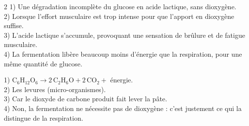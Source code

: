\begin{multicols}{2}
1) Une dégradation incomplète du glucose en acide lactique, sans dioxygène.\\
2) Lorsque l'effort musculaire est trop intense pour que l'apport en dioxygène suffise.\\
3) L'acide lactique s'accumule, provoquant une sensation de brûlure et de fatigue
musculaire.\\
4) La fermentation libère beaucoup moins d'énergie que la respiration, pour une même
quantité de glucose.

1) $\mathrm{C_6H_{12}O_6\to2\,C_2H_6O+2\,CO_2+}$ énergie.\\
2) Les levures (micro-organismes).\\
3) Car le dioxyde de carbone produit fait lever la pâte.\\
4) Non, la fermentation ne nécessite pas de dioxygène : c'est justement ce qui la
distingue de la respiration.

\end{multicols}
\exercicesBanner
